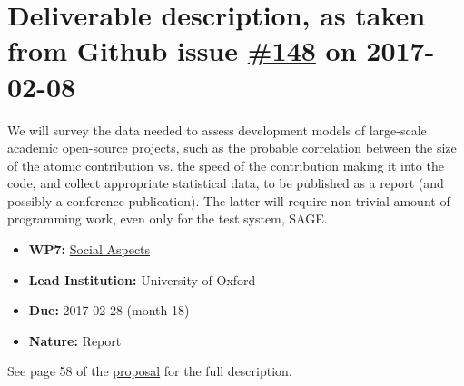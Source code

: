 \section*{\texorpdfstring{Deliverable description, as taken from Github
issue
\href{https://github.com/OpenDreamKit/OpenDreamKit/issues/148}{\#148} on
2017-02-08}{Deliverable description, as taken from Github issue \#148 on 2017-02-08}}\label{deliverable-description-as-taken-from-github-issue-148-on-2017-02-08}
We will survey the data needed to assess development models of large-scale
academic open-source projects, such as the probable correlation between the
size of the atomic contribution vs. the speed of the contribution making it
into the code, and collect appropriate statistical data, to be published as a
report (and possibly a conference publication). The latter will require
non-trivial amount of programming work, even only for the test system, SAGE.

\begin{itemize}
\tightlist
\item
  \textbf{WP7:}
  \href{https://github.com/OpenDreamKit/OpenDreamKit/tree/master/WP7}{Social
  Aspects}
\item
  \textbf{Lead Institution:} University of Oxford
\item
  \textbf{Due:} 2017-02-28 (month 18)
\item
  \textbf{Nature:} Report
\end{itemize}

See page 58 of the
\href{https://github.com/OpenDreamKit/OpenDreamKit/raw/master/Proposal/proposal-www.pdf}{proposal}
for the full description.
